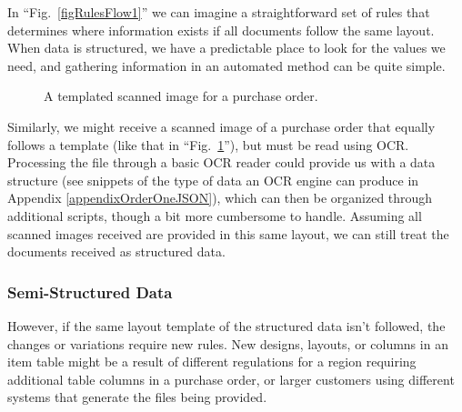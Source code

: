 \documentclass[conference]{IEEEtran}
\begin{document}
In ``Fig.~\ref{figRulesFlow1}'' we can imagine a straightforward set of rules that determines where information exists if all documents follow the same layout. When data is structured, we have a predictable place to look for the values we need, and gathering information in an automated method can be quite simple.

\begin{figure}[ht]
\centerline{
}
\caption{A templated scanned image for a purchase order.}
\label{figScanned1}
\end{figure}

Similarly, we might receive a scanned image of a purchase order that equally follows a template (like that in ``Fig.~\ref{figScanned1}''), but must be read using OCR. Processing the file through a basic OCR reader could provide us with a data structure (see snippets of the type of data an OCR engine can produce in Appendix \ref{appendixOrderOneJSON}), which can then be organized through additional scripts, though a bit more cumbersome to handle. Assuming all scanned images received are provided in this same layout, we can still treat the documents received as structured data.

\subsubsection{Semi-Structured Data}
However, if the same layout template of the structured data isn't followed, the changes or variations require new rules. New designs, layouts, or columns in an item table might be a result of different regulations for a region requiring additional table columns in a purchase order, or larger customers using different systems that generate the files being provided.
\end{document}
